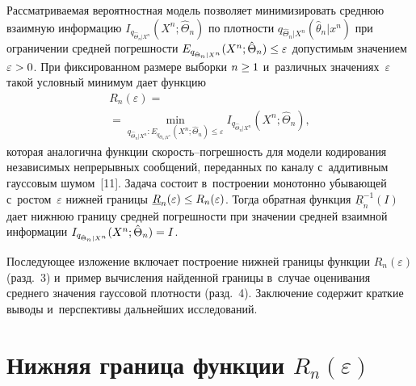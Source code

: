 \begin{multicols}{2}
Рассматриваемая вероятностная модель позволяет минимизировать сред\-нюю взаимную 
информацию $I_{q_{\hat{\Theta}_n\vert X^n}} (X^n;\hat{\Theta}_n)$ по плот\-ности 
$q_{\hat{\Theta}_n\vert X^n}(\hat{\theta}_n\vert x^n)$ при ограничении средней по\-греш\-ности 
$E_{q_{\hat{\Theta}_n\vert X^n}}(X^n;\hat{\Theta}_n)\hm\leq \varepsilon$ допустимым 
значением $\varepsilon\hm> 0$. При фиксированном размере выборки $n\hm\geq 1$ 
и~различных значениях~$\varepsilon$ такой условный минимум дает 
функцию 
\begin{multline}
R_n(\varepsilon) ={}\\
{}= \min\limits_{q_{\hat{\Theta}_n\vert X^n}: E_{q_{\hat{\Theta}_n\vert X^n}} 
(X^n;\hat{\Theta}_n)\leq \varepsilon} I_{q_{\hat{\Theta}_n\vert X^n}} (X^n; \hat{\Theta}_n),
\label{e3-lan}
\end{multline}
которая аналогична функции ско\-рость--по\-греш\-ность для модели кодирования независимых 
непрерывных сообщений, переданных по каналу с~аддитивным гауссовым шумом~[11]. Задача 
состоит в~построении монотонно убывающей с~рос\-том~$\varepsilon$ нижней границы 
$\underline{R}_n (\varepsilon) \hm\leq R_n(\varepsilon)$. Тогда обратная функция 
$\underline{R}_n^{-1}(I)$ дает ниж\-нюю границу сред\-ней по\-греш\-ности при значении сред\-ней 
взаимной информации $I_{q_{\hat{\Theta}_n\vert X^n}}(X^n; \hat{\Theta}_n)\hm=I$. 

Последующее изложение включает построение нижней границы функции $R_n(\varepsilon)$ 
(разд.~3) и~пример вы\-чис\-ле\-ния найденной границы в~случае оценивания сред\-не\-го значения 
гауссовой плот\-ности (разд.~4). Заключение содержит краткие выводы и~перспективы 
дальнейших исследований.

\section{Нижняя граница функции $R_n(\varepsilon)$}


\end{multicols}
